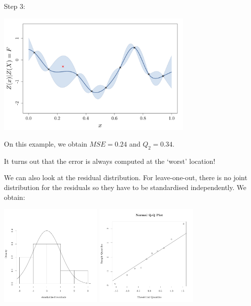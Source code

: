 \documentclass{beamer}
\begin{document}
\begin{frame}{}
Step 3:\\ \vspace{3mm}
\begin{center}
\includegraphics[height=6cm]{figures/R/VALID_crossval3}
\end{center}
\end{frame}

\begin{frame}{}
On this example, we obtain $MSE = 0.24$ and $Q_2 = 0.34$. \\ \vspace{3mm} 
\begin{center}
\end{center}

\pause
\vspace{5mm}
It turns out that the error is always computed at the `worst' location!
\end{frame}

\begin{frame}{}
We can also look at the residual distribution. For leave-one-out, there is no joint distribution for the residuals so they have to be standardised independently. We obtain: 
\begin{center}
\includegraphics[height=5cm]{figures/R/VALID_crossvalhist} \qquad
\includegraphics[height=5cm]{figures/R/VALID_crossvalqqplot}
\end{center}
\end{frame}
\end{document}
